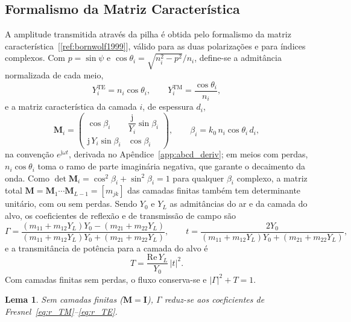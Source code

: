 \documentclass[12pt,a4paper,oneside]{book}
\theoremstyle{remark}
\newcommand{\jj}{\mathrm{j}}
\newcommand{\citar}[1]{[\ref{ref:#1}]}
\theoremstyle{plain}
\newtheorem{lema}{Lema}[chapter]
\theoremstyle{definition}
\begin{document}
\subsection{Formalismo da Matriz Característica}

A amplitude transmitida através da pilha é obtida pelo formalismo da matriz
característica~\citar{bornwolf1999}, válido para as duas polarizações e para
índices complexos. Com $p=\sin\psi$ e $\cos\theta_i=\sqrt{n_i^2-p^2}/n_i$, define-se
a admitância normalizada de cada meio,
\begin{equation}
  Y_i^{\text{TE}}=n_i\cos\theta_i,\qquad
  Y_i^{\text{TM}}=\frac{\cos\theta_i}{n_i},
  \label{eq:admitancia}
\end{equation}
e a matriz característica da camada $i$, de espessura $d_i$,
\begin{equation}
  \mathbf{M}_i = \begin{pmatrix}
    \cos\beta_i & \dfrac{\jj}{Y_i}\sin\beta_i \\[6pt]
    \jj\,Y_i\sin\beta_i & \cos\beta_i
  \end{pmatrix},
  \qquad \beta_i=k_0\,n_i\cos\theta_i\,d_i ,
  \label{eq:ABCD_matrix}
\end{equation}
na convenção $e^{\jj\omega t}$, derivada no Apêndice~\ref{app:abcd_deriv}; em
meios com perdas, $n_i\cos\theta_i$ toma o ramo de parte imaginária negativa, que
garante o decaimento da onda. Como
$\det\mathbf M_i=\cos^2\beta_i+\sin^2\beta_i=1$ para qualquer $\beta_i$ complexo, a
matriz total $\mathbf M=\mathbf M_1\cdots\mathbf M_{L-1}=[m_{jk}]$ das camadas
finitas também tem determinante unitário, com ou sem perdas. Sendo $Y_0$ e $Y_L$
as admitâncias do ar e da camada do alvo, os coeficientes de reflexão e de
transmissão de campo são
\begin{equation}
  \Gamma=\frac{(m_{11}+m_{12}Y_L)Y_0-(m_{21}+m_{22}Y_L)}{(m_{11}+m_{12}Y_L)Y_0+(m_{21}+m_{22}Y_L)},
  \qquad
  t=\frac{2Y_0}{(m_{11}+m_{12}Y_L)Y_0+(m_{21}+m_{22}Y_L)},
  \label{eq:Gamma_TM}
\end{equation}
e a transmitância de potência para a camada do alvo é
\begin{equation}
  T=\frac{\mathrm{Re}\,Y_L}{Y_0}\,|t|^2 .
  \label{eq:T_TM_multi}
\end{equation}
Com camadas finitas sem perdas, o fluxo conserva-se e $|\Gamma|^2+T=1$.

\begin{lema}
\label{lema:reducao_fresnel}
Sem camadas finitas ($\mathbf M=\mathbf I$), $\Gamma$ reduz-se aos coeficientes
de Fresnel~\eqref{eq:r_TM}--\eqref{eq:r_TE}.
\end{lema}
\end{document}
